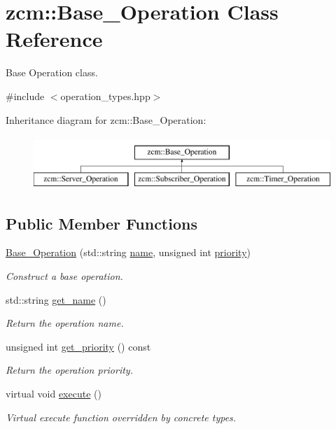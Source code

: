 \hypertarget{classzcm_1_1Base__Operation}{\section{zcm\-:\-:Base\-\_\-\-Operation Class Reference}
\label{classzcm_1_1Base__Operation}
}


Base Operation class.  




{\ttfamily \#include $<$operation\-\_\-types.\-hpp$>$}

Inheritance diagram for zcm\-:\-:Base\-\_\-\-Operation\-:\begin{figure}[H]
\begin{center}
\leavevmode
\includegraphics[height=2.000000cm]{classzcm_1_1Base__Operation}
\end{center}
\end{figure}
\subsection*{Public Member Functions}
\begin{DoxyCompactItemize}
\item 
\hyperlink{classzcm_1_1Base__Operation_a87b61a8e801615935c649bae05b9c88e}{Base\-\_\-\-Operation} (std\-::string \hyperlink{classzcm_1_1Base__Operation_a2e2192550818d8f063fc7b2c76c5e21c}{name}, unsigned int \hyperlink{classzcm_1_1Base__Operation_a38af3bcc2578ef215772d595bf3fa358}{priority})
\begin{DoxyCompactList}\small\item\em Construct a base operation. \end{DoxyCompactList}\item 
std\-::string \hyperlink{classzcm_1_1Base__Operation_a46b6a3f23e18bc35425ec2dab80c849f}{get\-\_\-name} ()
\begin{DoxyCompactList}\small\item\em Return the operation name. \end{DoxyCompactList}\item 
unsigned int \hyperlink{classzcm_1_1Base__Operation_a3b15b35c31ed173d2abb193e9fba32ef}{get\-\_\-priority} () const 
\begin{DoxyCompactList}\small\item\em Return the operation priority. \end{DoxyCompactList}\item 
virtual void \hyperlink{classzcm_1_1Base__Operation_a58cb533edd6e6f220d2d1c260fbddca4}{execute} ()
\begin{DoxyCompactList}\small\item\em Virtual execute function overridden by concrete types. \end{DoxyCompactList}\end{DoxyCompactItemize}
